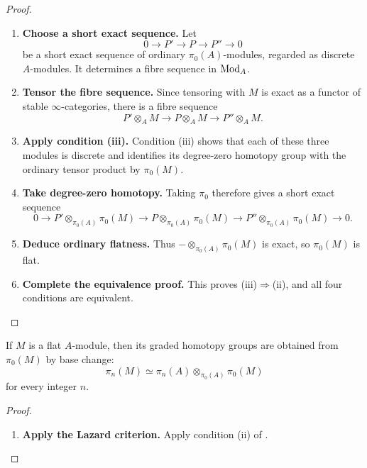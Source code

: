 \begin{proof}
\begin{enumerate}[label=\textup{(\arabic*)}]
    \item \textbf{Choose a short exact sequence.}
    Let
    \[
        0\longrightarrow P'
        \longrightarrow P
        \longrightarrow P''
        \longrightarrow0
    \]
    be a short exact sequence of ordinary \(\pi_0(A)\)-modules, regarded as
    discrete \(A\)-modules. It determines a fibre sequence in \(\operatorname{Mod}_A\).

    \item \textbf{Tensor the fibre sequence.}
    Since tensoring with \(M\) is exact as a functor of stable
    \(\infty\)-categories, there is a fibre sequence
    \[
        P'\otimes_AM
        \longrightarrow
        P\otimes_AM
        \longrightarrow
        P''\otimes_AM.
    \]

    \item \textbf{Apply condition \textup{(iii)}.}
    Condition \textup{(iii)} shows that each of these three modules is
    discrete and identifies its degree-zero homotopy group with the ordinary
    tensor product by \(\pi_0(M)\).

    \item \textbf{Take degree-zero homotopy.}
    Taking \(\pi_0\) therefore gives a short
    exact sequence
    \[
        0\longrightarrow
        P'\otimes_{\pi_0(A)}\pi_0(M)
        \longrightarrow
        P\otimes_{\pi_0(A)}\pi_0(M)
        \longrightarrow
        P''\otimes_{\pi_0(A)}\pi_0(M)
        \longrightarrow0.
    \]

    \item \textbf{Deduce ordinary flatness.}
    Thus \(-\otimes_{\pi_0(A)}\pi_0(M)\) is exact, so \(\pi_0(M)\) is flat.

    \item \textbf{Complete the equivalence proof.}
    This proves \textup{(iii)}\(\Rightarrow\)\textup{(ii)}, and all four
    conditions are equivalent.
\end{enumerate}
\end{proof}

\begin{corollary}
\label{cor:flat-modules-detected-homotopy}
If $M$ is a flat $A$-module, then its graded homotopy groups are obtained
from $\pi_0(M)$ by base change:
\[
    \pi_n(M)
    \simeq
    \pi_n(A)
    \otimes_{\pi_0(A)}
    \pi_0(M)
\]
for every integer $n$.
\end{corollary}

\begin{proof}
\leavevmode
\begin{enumerate}[label=\textup{(\arabic*)}]
    \item \textbf{Apply the Lazard criterion.}
    Apply condition \textup{(ii)} of .
\end{enumerate}
\end{proof}

